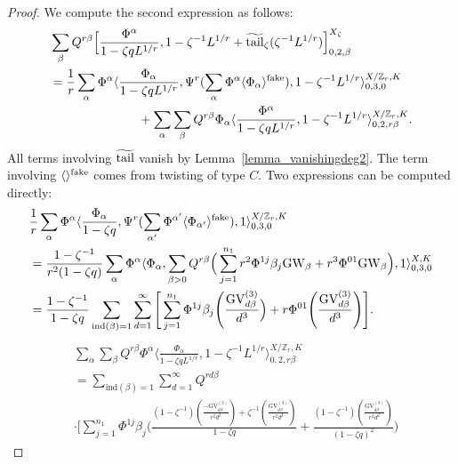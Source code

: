 \documentclass[11pt]{amsart}
\newtheorem*{main theorem*}{Main Theorem}
\theoremstyle{remark}
\numberwithin{equation}{section}
\newcommand{\fake}{{\rm fake}}
\newcommand{\tail}{{\rm tail}}
\newcommand{\GW}{{\mathrm{GW}}}
\newcommand{\GV}{{\mathrm{GV}}}
\newcommand{\ind}{{\mathrm{ind}}}
\begin{document}
\begin{proof}
We compute the second expression as follows:
\[ 
\begin{split}
    &\sum_{\beta} Q^{r\beta}\Big[ \frac{\Phi^{\alpha}}{1-\zeta q L^{1/r}}, 1-\zeta^{-1} L^{1/r} +  \widetilde{\tail}_{\zeta}(\zeta^{-1}L^{1/r})\Big]^{X_{\zeta}}_{0,2,\beta} 
    \\
    &=  \frac{1}{r}\sum_{\alpha}\Phi^{\alpha} \langle \frac{\Phi_{\alpha}}{1-\zeta q L^{1/r}}, \Psi^r ( \sum_{\alpha}\Phi^{\alpha}\langle \Phi_{\alpha}\rangle^{\fake} ) , 1-\zeta^{-1} L^{1/r} \rangle^{X/\mathbb{Z}_r, K}_{0,3,0}
    \\
    &\hspace{25mm} +\sum_{\alpha} \sum_{\beta} Q^{r\beta} \Phi_{\alpha} \langle \frac{\Phi^{\alpha}}{1-\zeta q L^{1/r}}, 1-\zeta^{-1} L^{1/r}\rangle^{ X/ \mathbb{Z}_r, K }_{0,2,r\beta}.
\end{split}
\]
All terms involving $\widetilde{\tail}$ vanish by Lemma~\ref{lemma_vanishingdeg2}.
The term involving $\langle \rangle^{\fake}$ comes from twisting of type $C$. Two expressions can be computed directly: 
\begin{equation} \label{eqn_t=0_fake}
\begin{split}
    & \frac{1}{r} \sum_{\alpha} \Phi^{\alpha} \langle \frac{\Phi_{\alpha}}{1-\zeta q}, \Psi^r ( \sum_{\alpha'} \Phi^{\alpha'} \langle \Phi_{\alpha'} \rangle^{\fake} ), 1 \rangle_{0,3,0}^{X/ \mathbb{Z}_r,K}
    \\
    & = \frac{1-\zeta^{-1}}{r^2(1-\zeta q)}\sum_{\alpha} \Phi^{\alpha}\langle \Phi_{\alpha}, \sum_{\beta>0} Q^{r\beta}\Big( \sum_{j=1}^{n_1}r^2\Phi^{1j}\beta_j \GW_{\beta} + r^3 \Phi^{01} \GW_{\beta} \Big), 1 \rangle_{0,3,0}^{X,K}
    \\
    &= \frac{1-\zeta^{-1}}{1-\zeta q}\sum_{\ind(\beta)=1}\sum_{d=1}^{\infty}\Bigg[\sum_{j=1}^{n_1} \Phi^{1j}\beta_j \Bigg(\frac{\GV_{d\beta}^{(3)}}{d^3}\Big) + r \Phi^{01} \Bigg(\frac{\GV_{d\beta}^{(3)}}{d^3} \Bigg) \Bigg].
\end{split}
\end{equation}
\begin{equation} \label{eqn_t=0_main}
\begin{split}
    & \sum_{\alpha} \sum_{\beta} Q^{r\beta} \Phi^{\alpha} \langle \frac{\Phi_{\alpha}}{1-\zeta q L^{1/r}}, 1-\zeta^{-1} L^{1/r}\rangle^{ X/ \mathbb{Z}_r,K }_{0,2,r\beta}
    \\
    & =\sum_{\ind(\beta)=1} \sum_{d=1}^{\infty} Q^{rd\beta}
    \\
    &\cdot\Bigg[ \sum_{j=1}^{n_1} \Phi^{1j} \beta_j \Bigg( \frac{(1-\zeta^{-1})(\frac{-\GV_{d\beta}^{(3)}}{r^2d^2}) + \zeta^{-1} (\frac{\GV^{(3)}_{d\beta}}{r^2d^2} ) }{1-\zeta q} + \frac{(1-\zeta^{-1}) (\frac{\GV_{d\beta}^{(3)}}{r^2d^2}) }{(1-\zeta q)^2} \Bigg)

\end{split}
\end{equation}
\end{proof}
\end{document}
